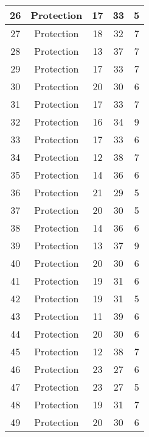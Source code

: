 \documentclass[results.tex]{subfiles}
\begin{document}
\begin{center}
\begin{tabular}{| c || c | c | c | c |}
    \hline
    26 & Protection & 17 & 33 & 5 \\ 
    \hline
    27 & Protection & 18 & 32 & 7 \\ 
    \hline
    28 & Protection & 13 & 37 & 7 \\ 
    \hline
    29 & Protection & 17 & 33 & 7 \\ 
    \hline
    30 & Protection & 20 & 30 & 6 \\ 
    \hline
    31 & Protection & 17 & 33 & 7 \\ 
    \hline
    32 & Protection & 16 & 34 & 9 \\ 
    \hline
    33 & Protection & 17 & 33 & 6 \\ 
    \hline
    34 & Protection & 12 & 38 & 7 \\ 
    \hline
    35 & Protection & 14 & 36 & 6 \\ 
    \hline
    36 & Protection & 21 & 29 & 5 \\ 
    \hline
    37 & Protection & 20 & 30 & 5 \\ 
    \hline
    38 & Protection & 14 & 36 & 6 \\ 
    \hline
    39 & Protection & 13 & 37 & 9 \\ 
    \hline
    40 & Protection & 20 & 30 & 6 \\ 
    \hline
    41 & Protection & 19 & 31 & 6 \\ 
    \hline
    42 & Protection & 19 & 31 & 5 \\ 
    \hline
    43 & Protection & 11 & 39 & 6 \\ 
    \hline
    44 & Protection & 20 & 30 & 6 \\ 
    \hline
    45 & Protection & 12 & 38 & 7 \\ 
    \hline
    46 & Protection & 23 & 27 & 6 \\ 
    \hline
    47 & Protection & 23 & 27 & 5 \\ 
    \hline
    48 & Protection & 19 & 31 & 7 \\ 
    \hline
    49 & Protection & 20 & 30 & 6 \\ 
    \hline   \end{tabular}
\end{center}
\end{document}
